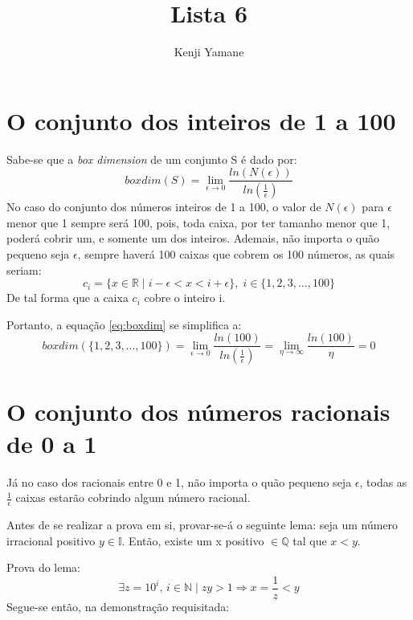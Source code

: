 \documentclass{article}[twocolumn]
\title{Lista 6}
\author{Kenji Yamane}
\begin{document}
	\maketitle
	\section{O conjunto dos inteiros de 1 a 100}
	Sabe-se que a \textit{box dimension} de um conjunto S \'e dado por:
	\begin{equation}
		boxdim(S) = \lim_{\epsilon \rightarrow 0}\frac{ln(N(\epsilon))}{ln(\frac{1}{\epsilon})}
		\label{eq:boxdim}
	\end{equation}
	No caso do conjunto dos n\'umeros inteiros de 1 a 100, o valor de $N(\epsilon)$ para
	$\epsilon$ menor que 1 sempre ser\'a 100, pois, toda caixa, por ter tamanho menor que 1,
	poder\'a cobrir um, e somente um dos inteiros. Ademais, n\~ao importa o qu\~ao pequeno seja
	$\epsilon$, sempre haver\'a 100 caixas que cobrem os 100 n\'umeros, as quais seriam:
	\begin{equation}
		c_{i} = \{x \in \mathbb{R} \; | \; i - \epsilon < x < i + \epsilon\}, \;
		i \in \{1, 2, 3, ..., 100\}
		\nonumber
	\end{equation}
	De tal forma que a caixa $c_{i}$ cobre o inteiro i.

	Portanto, a equa\c{c}\~ao \ref{eq:boxdim} se simplifica a:
	\begin{equation}
		boxdim(\{1, 2, 3, ..., 100\}) =
		\lim_{\epsilon \rightarrow 0}\frac{ln(100)}{ln(\frac{1}{\epsilon})} =
		\lim_{\eta \rightarrow \infty}\frac{ln(100)}{\eta} = 0
		\nonumber
	\end{equation}
	\section{O conjunto dos n\'umeros racionais de 0 a 1}
	J\'a no caso dos racionais entre 0 e 1, n\~ao importa o qu\~ao pequeno seja $\epsilon$,
	todas as $\frac{1}{\epsilon}$ caixas estar\~ao cobrindo algum n\'umero racional.

	Antes de se realizar a prova em si, provar-se-\'a o seguinte lema: seja um n\'umero
	irracional positivo $y \in \mathbb{I}$. Ent\~ao, existe um x positivo $\in \mathbb{Q}$ tal que
	$x < y$.

	Prova do lema:
	\begin{equation}
		\exists z = 10^{i}, \, i \in \mathbb{N} \; | \; zy > 1
		\Rightarrow x = \frac{1}{z} < y
		\nonumber
	\end{equation}
	Segue-se ent\~ao, na demonstra\c{c}\~ao requisitada:
	
\end{document}
